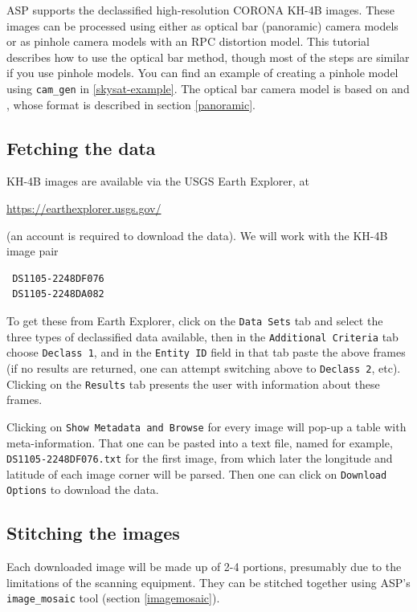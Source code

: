ASP supports the declassified high-resolution CORONA KH-4B images.
These images can be processed using either as optical bar (panoramic) camera models or as 
pinhole camera models with an RPC distortion model.  This tutorial describes how to use
the optical bar method, though most of the steps are similar if you use pinhole models.
You can find an example of creating a pinhole model using \texttt{cam\_gen} in \ref{skysat-example}.
The optical bar camera model is based on \cite{schenk2003rigorous}
and \cite{sohn2004mathematical}, whose format is described in section \ref{panoramic}.

\subsection{Fetching the data}

KH-4B images are available via the USGS Earth Explorer, at
\begin{center}
 \url{https://earthexplorer.usgs.gov/}
\end{center}

(an account is required to download the data). We will work with the KH-4B image pair

\begin{verbatim}
 DS1105-2248DF076
 DS1105-2248DA082
\end{verbatim}

To get these from Earth Explorer, click on the \texttt{Data Sets}
tab and select the three types of declassified data available, then in the 
\texttt{Additional Criteria} tab choose \texttt{Declass 1}, and in
the \texttt{Entity ID} field in that tab paste the above frames (if no results
are returned, one can attempt switching above to \texttt{Declass 2},
etc). Clicking on the \texttt{Results} tab presents the user with information about
these frames.

Clicking on \texttt{Show Metadata and Browse} for every
image will pop-up a table with meta-information. That one can be pasted
into a text file, named for example, \texttt{DS1105-2248DF076.txt} for the
first image, from which later the longitude and latitude of each image corner
will be parsed. Then one can click on \texttt{Download Options} 
to download the data. 

\subsection{Stitching the images}

Each downloaded image will be made up of 2-4 portions, presumably due
to the limitations of the scanning equipment. They can be stitched together
using ASP's \texttt{image\_mosaic} tool (section \ref{imagemosaic}).

